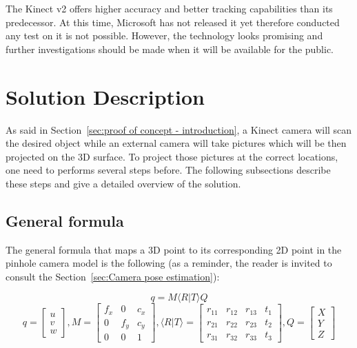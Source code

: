 The Kinect v2 offers higher accuracy and better tracking capabilities than its predecessor. At this time, Microsoft has not released it yet therefore conducted any test on it is not possible. However, the technology looks promising and further investigations should be made when it will be available for the public.

\section{Solution Description}
As said in Section~\ref{sec:proof of concept - introduction}, a Kinect camera will scan the desired object while an external camera will take pictures which will be then projected on the 3D surface. To project those pictures at the correct locations, one need to performs several steps before. The following subsections describe these steps and give a detailed overview of the solution. 

\subsection{General formula}

The general formula that maps a 3D point to its corresponding 2D point in the pinhole camera model is the following (as a reminder, the reader is invited to consult the Section~\ref{sec:Camera pose estimation}):

\begin{equation}
  q = M\langle R\vert T\rangle Q  
  \label{eq:general equation}    
\end{equation}
\begin{equation}
  q = \begin{bmatrix}
       u \\
       v \\
       w 
     \end{bmatrix}, 
  M = \begin{bmatrix}
       f_x & 0 & c_x \\
       0 & f_y & c_y \\
       0 & 0 & 1
     \end{bmatrix}, 
  \langle R\vert T\rangle =  \begin{bmatrix}
       r_{11} & r_{12} & r_{13} & t_1 \\
       r_{21} & r_{22} & r_{23} & t_2\\
       r_{31} & r_{32} & r_{33} & t_3
     \end{bmatrix},  
  Q = \begin{bmatrix}
       X \\
       Y \\
       Z 
     \end{bmatrix}
\end{equation}

